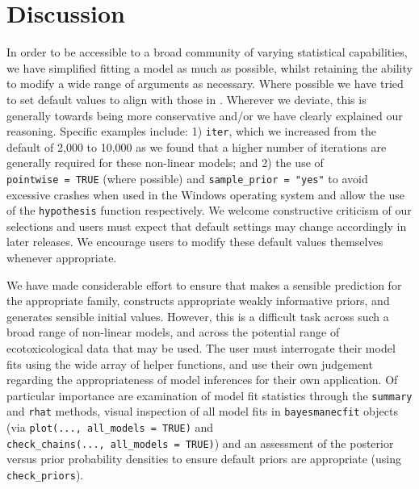 \documentclass[
  shortnames]{jss}
\begin{document}
\newpage

\hypertarget{discussion}{%
\section{Discussion}\label{discussion}}

In order to be accessible to a broad community of varying statistical capabilities, we have simplified fitting a  model as much as possible, whilst retaining the ability to modify a wide range of arguments as necessary. Where possible we have tried to set default values to align with those in . Wherever we deviate, this is generally towards being more conservative and/or we have clearly explained our reasoning. Specific examples include: 1) \texttt{iter}, which we increased from the  default of 2,000 to 10,000 as we found that a higher number of iterations are generally required for these non-linear models; and 2) the use of \texttt{pointwise\ =\ TRUE} (where possible) and \texttt{sample\_prior\ =\ "yes"} to avoid excessive  crashes when used in the Windows operating system and allow the use of the \texttt{hypothesis} function respectively. We welcome constructive criticism of our selections and users must expect that default settings may change accordingly in later releases. We encourage users to modify these default values themselves whenever appropriate.

We have made considerable effort to ensure that  makes a sensible prediction for the appropriate family, constructs appropriate weakly informative priors, and generates sensible initial values. However, this is a difficult task across such a broad range of non-linear models, and across the potential range of ecotoxicological data that may be used. The user must interrogate their model fits using the wide array of helper functions, and use their own judgement regarding the appropriateness of model inferences for their own application. Of particular importance are examination of model fit statistics through the \texttt{summary} and \texttt{rhat} methods, visual inspection of all model fits in \texttt{bayesmanecfit} objects (via \texttt{plot(...,\ all\_models\ =\ TRUE)} and \texttt{check\_chains(...,\ all\_models\ =\ TRUE)}) and an assessment of the posterior versus prior probability densities to ensure default priors are appropriate (using \texttt{check\_priors}).
\end{document}
